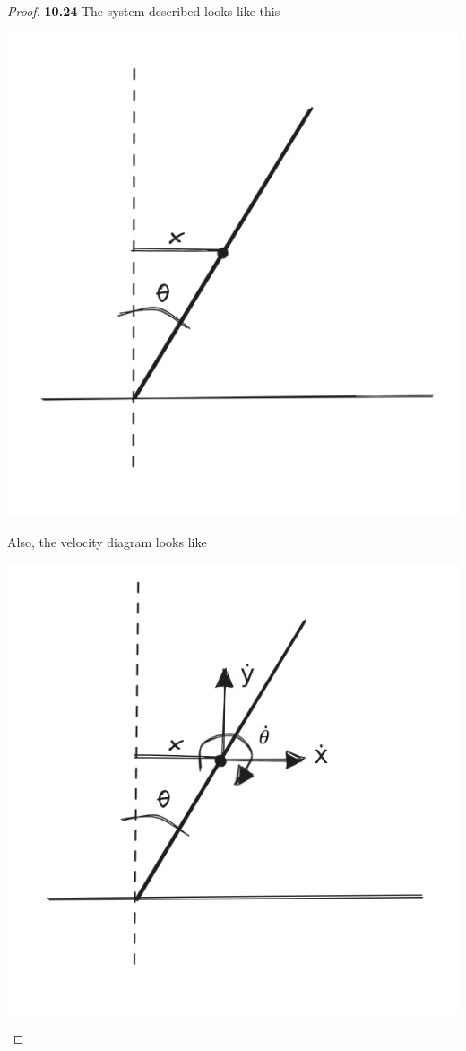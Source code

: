 \documentclass[11pt]{article}
\theoremstyle{definition}
\begin{document}
	\begin{proof}{\textbf{10.24}}
    The system described looks like this
    \begin{center}
        \includegraphics[scale=0.5]{ch10-24.png}
    \end{center}
    Also, the velocity diagram looks like
    \begin{center}
        \includegraphics[scale=0.5]{ch10-24-1.png}

\end{center}
\end{proof}
\end{document}
